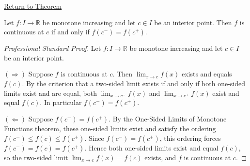 \newpage
{}
\label{prf:monotone-continuity-criterion}

\begin{remark*}[Return]
\hyperref[cor:monotone-continuity-criterion]{Return to Theorem}
\end{remark*}

\begin{theorem*}
Let $f : I \to \mathbb{R}$ be monotone increasing and let $c \in I$ be an interior point. Then $f$ is continuous at $c$ if and only if $f(c^{-}) = f(c^{+})$.
\end{theorem*}

\begin{proof}[Professional Standard Proof]
\LRAProofBodyStart
Let $f : I \to \mathbb{R}$ be monotone increasing and let $c \in I$ be an interior point.

$(\Rightarrow)$ Suppose $f$ is continuous at $c$. Then $\lim_{x \to c} f(x)$ exists and equals $f(c)$. By the criterion that a two-sided limit exists if and only if both one-sided limits exist and are equal, both $\lim_{x \to c^{-}} f(x)$ and $\lim_{x \to c^{+}} f(x)$ exist and equal $f(c)$. In particular $f(c^{-}) = f(c^{+})$.

$(\Leftarrow)$ Suppose $f(c^{-}) = f(c^{+})$. By the One-Sided Limits of Monotone Functions theorem, these one-sided limits exist and satisfy the ordering $f(c^{-}) \leq f(c) \leq f(c^{+})$. Since $f(c^{-}) = f(c^{+})$, this ordering forces $f(c^{-}) = f(c) = f(c^{+})$. Hence both one-sided limits exist and equal $f(c)$, so the two-sided limit $\lim_{x \to c} f(x) = f(c)$ exists, and $f$ is continuous at $c$.
\end{proof}

